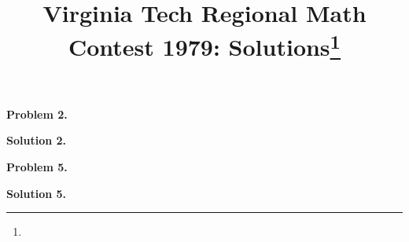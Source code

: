 \documentclass[10pt]{article}
\newcommand{\problem}[1]{\textbf{Problem #1.}}
\newcommand{\solution}[1]{\textbf{Solution #1.}}
\begin{document}
\title{Virginia Tech Regional Math Contest 1979: Solutions\footnote{\disclaimer}}
\author{\vspace{-2ex}}
\date{\vspace{-5ex}} %
\maketitle

% 
% 

\problem{2}


\solution{2}


% 
% 

% 
% 

\problem{5}


\solution{5}


% 
% 

% 
% 

% 
% 
\end{document}

